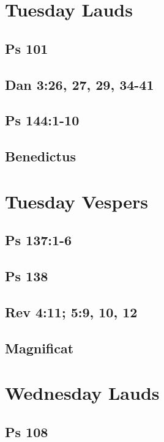\section{Tuesday Lauds}

\subsection{Ps 101}

\subsection{Dan 3:26, 27, 29, 34-41}

\subsection{Ps 144:1-10}

\subsection{Benedictus}


\section{Tuesday Vespers}

\subsection{Ps 137:1-6}

\subsection{Ps 138}

\subsection{Rev 4:11; 5:9, 10, 12}

\subsection{Magnificat}


\section{Wednesday Lauds}

\subsection{Ps 108}

